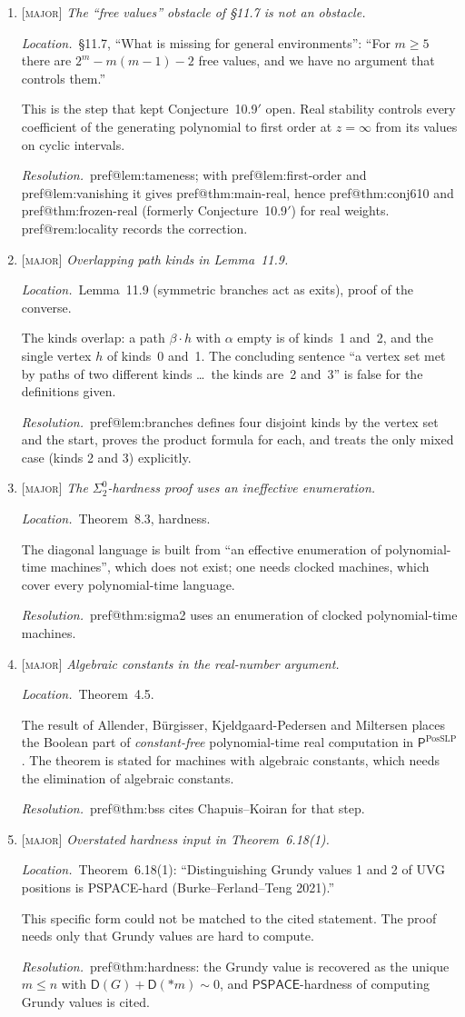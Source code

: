 \documentclass[11pt]{amsart}
\makeatletter
\newcommand{\pref}[1]{\csname pref@#1\endcsname}
\newcommand{\PSPACE}{\mathsf{PSPACE}}
\newcommand{\Pclass}{\mathsf{P}}
\newcommand{\sev}[1]{\textsc{[#1]}}
\newcommand{\fix}{\par\noindent\emph{Resolution.}\ }
\newcommand{\where}[1]{\par\noindent\emph{Location.}\ #1\par\noindent}
\makeatother
\begin{document}
\begin{enumerate}[label=\textbf{I.\arabic*},leftmargin=*,widest=I.22]
\item \sev{major} \emph{The ``free values'' obstacle of \S11.7 is not an obstacle.}
\where{\S11.7, ``What is missing for general environments'': ``For $m\ge5$ there are $2^m-m(m-1)-2$ free values, and we have no argument that controls them.''}
This is the step that kept Conjecture~10.9$'$ open. Real stability controls every coefficient of the generating polynomial to first order at $z=\infty$ from its values on cyclic intervals.
\fix \pref{lem:tameness}; with \pref{lem:first-order} and \pref{lem:vanishing} it gives \pref{thm:main-real}, hence \pref{thm:conj610} and \pref{thm:frozen-real} (formerly Conjecture~10.9$'$) for real weights. \pref{rem:locality} records the correction.

\item \sev{major} \emph{Overlapping path kinds in Lemma~11.9.}
\where{Lemma~11.9 (symmetric branches act as exits), proof of the converse.}
The kinds overlap: a path $\beta\cdot h$ with $\alpha$ empty is of kinds~1 and~2, and the single vertex $h$ of kinds~0 and~1. The concluding sentence ``a vertex set met by paths of two different kinds \dots\ the kinds are~2 and~3'' is false for the definitions given.
\fix \pref{lem:branches} defines four disjoint kinds by the vertex set and the start, proves the product formula for each, and treats the only mixed case (kinds 2 and 3) explicitly.

\item \sev{major} \emph{The $\Sigma^0_2$-hardness proof uses an ineffective enumeration.}
\where{Theorem~8.3, hardness.}
The diagonal language is built from ``an effective enumeration of polynomial-time machines'', which does not exist; one needs clocked machines, which cover every polynomial-time language.
\fix \pref{thm:sigma2} uses an enumeration of clocked polynomial-time machines.

\item \sev{major} \emph{Algebraic constants in the real-number argument.}
\where{Theorem~4.5.}
The result of Allender, B\"urgisser, Kjeldgaard-Pedersen and Miltersen places the Boolean part of \emph{constant-free} polynomial-time real computation in $\Pclass^{\mathrm{PosSLP}}$. The theorem is stated for machines with algebraic constants, which needs the elimination of algebraic constants.
\fix \pref{thm:bss} cites Chapuis--Koiran for that step.

\item \sev{major} \emph{Overstated hardness input in Theorem~6.18(1).}
\where{Theorem~6.18(1): ``Distinguishing Grundy values 1 and 2 of UVG positions is PSPACE-hard (Burke--Ferland--Teng 2021).''}
This specific form could not be matched to the cited statement. The proof needs only that Grundy values are hard to compute.
\fix \pref{thm:hardness}: the Grundy value is recovered as the unique $m\le n$ with $\mathsf D(G)+\mathsf D(*m)\sim0$, and $\PSPACE$-hardness of computing Grundy values is cited.


\end{enumerate}
\end{document}
